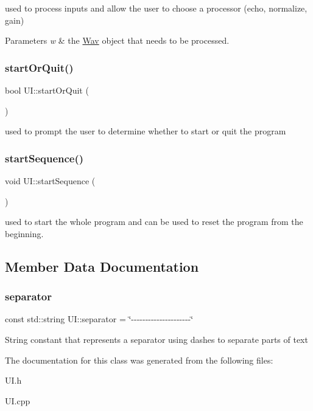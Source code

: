 used to process inputs and allow the user to choose a processor (echo, normalize, gain) 
\begin{DoxyParams}{Parameters}
{\em w} & the \hyperlink{classWav}{Wav} object that needs to be processed. \\
\hline
\end{DoxyParams}
\mbox{\label{classUI_ac9b2da5386256bf5d47e59306c3743a0}} 
\subsubsection{\texorpdfstring{start\+Or\+Quit()}{startOrQuit()}}
{\footnotesize\ttfamily bool U\+I\+::start\+Or\+Quit (\begin{DoxyParamCaption}{ }\end{DoxyParamCaption})}

used to prompt the user to determine whether to start or quit the program \mbox{\label{classUI_abacdf6ae7042f82147d748c5669f5ca3}} 
\subsubsection{\texorpdfstring{start\+Sequence()}{startSequence()}}
{\footnotesize\ttfamily void U\+I\+::start\+Sequence (\begin{DoxyParamCaption}{ }\end{DoxyParamCaption})}

used to start the whole program and can be used to reset the program from the beginning. 

\subsection{Member Data Documentation}
\mbox{\label{classUI_a73df1331f3f022d956843672ad15d873}} 
\subsubsection{\texorpdfstring{separator}{separator}}
{\footnotesize\ttfamily const std\+::string U\+I\+::separator = \char`\"{}-\/-\/-\/-\/-\/-\/-\/-\/-\/-\/-\/-\/-\/-\/-\/-\/-\/-\/-\/-\/-\/\char`\"{}}

String constant that represents a separator using dashes to separate parts of text 

The documentation for this class was generated from the following files\+:\begin{DoxyCompactItemize}
\item 
U\+I.\+h\item 
U\+I.\+cpp\end{DoxyCompactItemize}
